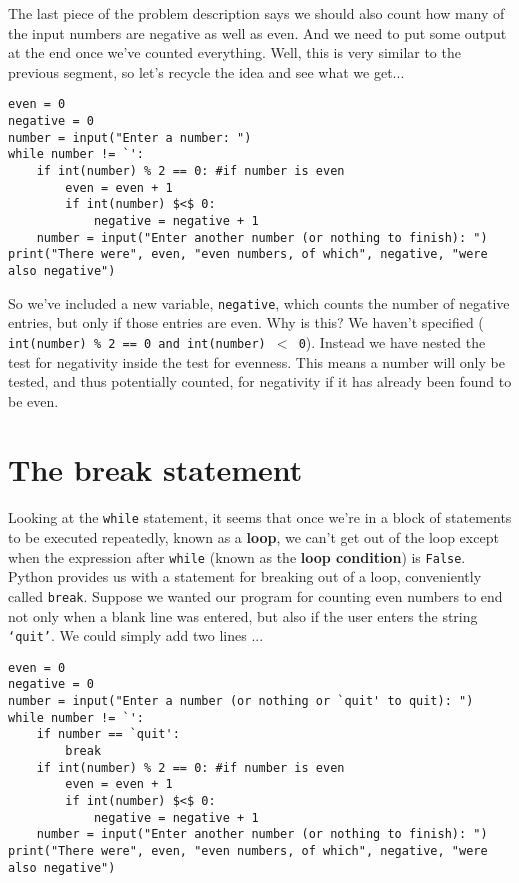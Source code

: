 The last piece of the problem description says we should also count   how many of the input numbers are negative as well as even. And we need   to put some output at the end once we've counted everything. Well, this   is very similar to the previous segment, so let's recycle the idea and   see what we get...
\begin{lstlisting}
even = 0
negative = 0
number = input("Enter a number: ")
while number != `':
    if int(number) % 2 == 0: #if number is even
        even = even + 1
        if int(number) $<$ 0:
            negative = negative + 1
    number = input("Enter another number (or nothing to finish): ")
print("There were", even, "even numbers, of which", negative, "were also negative")
\end{lstlisting}

So we've included a new variable, \texttt{negative}, which counts the   number of negative entries, but only if those entries are even. Why is   this? We haven't specified (
\texttt{int(number) \% 2 == 0 and int(number)   $<$ 0}). Instead we have nested the test for negativity inside   the test for evenness. This means a number will only be tested, and   thus potentially counted, for negativity if it has already been found   to be even.

\section{The break statement}

Looking at the \texttt{while} statement, it seems that once we're in a block   of statements to be executed repeatedly, known as a   \textbf{loop}, we can't get out of the loop except when the   expression after \texttt{while} (known as the \textbf{loop condition}) is \texttt{False}.   Python provides us with a statement for breaking out of a loop,   conveniently called \texttt{break}. Suppose we   wanted our program for counting even numbers to end not only when a   blank line was entered, but also if the user enters the string \texttt{`quit'}.   We could simply add two lines ...
\begin{lstlisting}
even = 0
negative = 0
number = input("Enter a number (or nothing or `quit' to quit): ")
while number != `':
    if number == `quit':
        break
    if int(number) % 2 == 0: #if number is even
        even = even + 1
        if int(number) $<$ 0:
            negative = negative + 1
    number = input("Enter another number (or nothing to finish): ")
print("There were", even, "even numbers, of which", negative, "were also negative")
\end{lstlisting}

